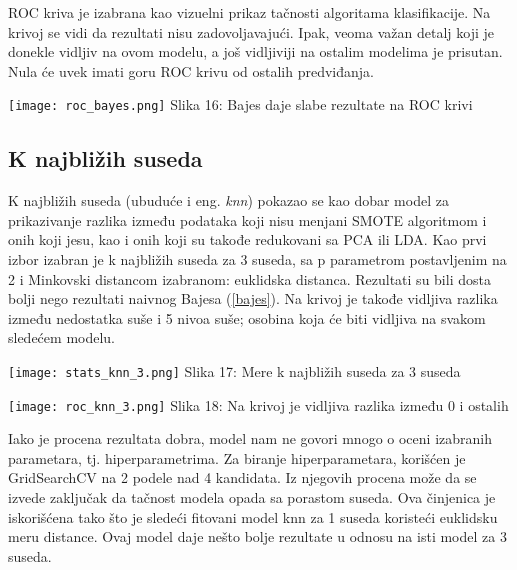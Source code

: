 \documentclass[a4paper]{article}
\begin{document}
{ROC kriva je izabrana kao vizuelni prikaz tačnosti algoritama klasifikacije. Na krivoj se vidi da rezultati nisu zadovoljavajući. Ipak, veoma važan detalj koji je donekle vidljiv na ovom modelu, a još vidljiviji na ostalim modelima je prisutan. Nula će uvek imati goru ROC krivu od ostalih predviđanja.

\noindent\begin{minipage}{1.0\textwidth}
\texttt{[image: roc\_bayes.png]}
\hphantom{aaaaaaaaaaaaaaaaaaa}Slika 16: Bajes daje slabe rezultate na ROC krivi\\
\end{minipage}

\subsection{K najbližih suseda}
\label{knn}

K najbližih suseda (ubuduće i eng. {\em knn}) pokazao se kao dobar model za prikazivanje razlika između podataka koji nisu menjani SMOTE algoritmom i onih koji jesu, kao i onih koji su takođe redukovani sa PCA ili LDA. Kao prvi izbor izabran je k najbližih suseda za 3 suseda, sa p parametrom postavljenim na 2 i Minkovski distancom izabranom: euklidska distanca. Rezultati su bili dosta bolji nego rezultati naivnog Bajesa (\ref{bajes}). Na krivoj je takođe vidljiva razlika između nedostatka suše i 5 nivoa suše; osobina koja će biti vidljiva na svakom sledećem modelu.\\

\noindent\begin{minipage}{0.4\textwidth}
\texttt{[image: stats\_knn\_3.png]}
Slika 17: Mere k najbližih suseda za 3 suseda\\
\end{minipage}
\begin{minipage}{0.6\textwidth}
\texttt{[image: roc\_knn\_3.png]}
\hphantom{aa}Slika 18: Na krivoj je vidljiva razlika između 0 i \hphantom{aa}ostalih\\
\end{minipage}

Iako je procena rezultata dobra, model nam ne govori mnogo o oceni izabranih parametara, tj. hiperparametrima. Za biranje hiperparametara, korišćen je GridSearchCV na 2 podele nad 4 kandidata. Iz njegovih procena može da se izvede zaključak da tačnost modela opada sa porastom suseda. Ova činjenica je iskorišćena tako što je sledeći fitovani model knn za 1 suseda koristeći euklidsku meru distance. Ovaj model daje nešto bolje rezultate u odnosu na isti model za 3 suseda.\\

}
\end{document}
